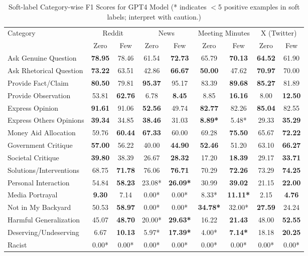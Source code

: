\begin{table}[htbp]
\centering
\begin{tabular}{l *{8}{c}}
\toprule
Category & \multicolumn{2}{c}{Reddit} & \multicolumn{2}{c}{News} & \multicolumn{2}{c}{Meeting Minutes} & \multicolumn{2}{c}{X (Twitter)} \\
& Zero & Few & Zero & Few & Zero & Few & Zero & Few \\
\midrule
Ask Genuine Question & \textbf{78.95} & 78.46 & 61.54 & \textbf{72.73} & 65.79 & \textbf{70.13} & \textbf{64.52} & 61.90 \\
Ask Rhetorical Question & \textbf{73.22} & 63.51 & 42.86 & \textbf{66.67} & \textbf{50.00} & 47.62 & \textbf{70.97} & 70.00 \\
Provide Fact/Claim & \textbf{80.50} & 79.81 & \textbf{95.37} & 95.17 & 83.39 & \textbf{89.68} & \textbf{85.27} & 81.89 \\
Provide Observation & 53.81 & \textbf{62.76} & 6.78 & \textbf{8.45} & 8.85 & \textbf{16.16} & 8.00 & \textbf{12.50} \\
Express Opinion & \textbf{91.61} & 91.06 & \textbf{52.56} & 49.74 & \textbf{82.77} & 82.26 & \textbf{85.04} & 82.55 \\
Express Others Opinions & \textbf{39.34} & 34.85 & \textbf{38.46} & 31.03 & \textbf{8.89*} & 5.48* & 29.33 & \textbf{35.29} \\
Money Aid Allocation & 59.76 & \textbf{60.44} & \textbf{67.33} & 60.00 & 69.28 & \textbf{75.50} & 65.67 & \textbf{72.22} \\
Government Critique & \textbf{57.00} & 56.22 & 40.00 & \textbf{44.90} & \textbf{52.46} & 51.20 & 63.10 & \textbf{66.27} \\
Societal Critique & \textbf{39.80} & 38.39 & 26.67 & \textbf{28.32} & 17.20 & \textbf{18.39} & 29.17 & \textbf{33.71} \\
Solutions/Interventions & 68.75 & \textbf{71.78} & 76.06 & \textbf{76.71} & 70.29 & \textbf{72.26} & 73.29 & \textbf{74.25} \\
Personal Interaction & 54.84 & \textbf{58.23} & 23.08* & \textbf{26.09*} & 30.99 & \textbf{39.02} & 21.15 & \textbf{22.00} \\
Media Portrayal & \textbf{9.30} & 7.14 & 0.00* & 0.00* & 8.33* & \textbf{11.11*} & 2.15 & \textbf{4.76} \\
Not in My Backyard & 50.53 & \textbf{58.97} & 0.00* & 0.00* & \textbf{34.78*} & 32.00* & \textbf{27.59} & 24.24 \\
Harmful Generalization & 45.07 & \textbf{48.70} & 20.00* & \textbf{29.63*} & 16.22 & \textbf{21.43} & 48.00 & \textbf{52.55} \\
Deserving/Undeserving & 6.67 & \textbf{10.13} & 5.97* & \textbf{17.39*} & 4.00* & \textbf{7.14*} & 18.18 & \textbf{20.25} \\
Racist & 0.00* & 0.00* & 0.00* & 0.00* & 0.00* & 0.00* & 0.00* & 0.00* \\
\bottomrule
\end{tabular}
\centering\caption{Soft-label Category-wise F1 Scores for GPT4 Model (* indicates $<$5 positive examples in soft labels; interpret with caution.)}
\label{tab:gpt4_category_breakdown}
\end{table}